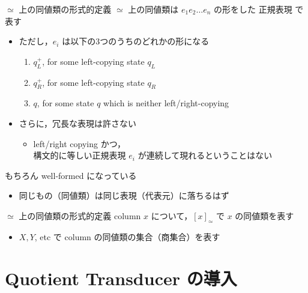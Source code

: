 \documentclass[presentation, xetex]{beamer}
\begin{document}
\begin{frame}[label={sec:org43cf7e5}]{\(\simeq\) 上の同値類の形式的定義}
\(\simeq\) 上の同値類は \(e_1 e_2 \dots e_n\) の形をした \alert{\alert{正規表現}} で表す
\begin{itemize}
\item ただし，\(e_i\) は以下の3つのうちのどれかの形になる

\begin{enumerate}
\item \(q_L^+\), for some left-copying state \(q_L\)

\item \(q_R^+\), for some left-copying state \(q_R\)

\item \(q\), for some state \(q\) which is neither left/right-copying
\end{enumerate}
\end{itemize}


\begin{itemize}
\item さらに，冗長な表現は許さない
\begin{itemize}
\item left/right copying かつ，\\
構文的に等しい正規表現 \(e_i\) が連続して現れるということはない
\end{itemize}
\end{itemize}


もちろん well-formed になっている
\begin{itemize}
\item 同じもの（同値類）は同じ表現（代表元）に落ちるはず
\end{itemize}
\end{frame}



\begin{frame}[label={sec:org5d0e790}]{\(\simeq\) 上の同値類の形式的定義}
column \(x\) について，\([x]_\simeq\) で \(x\) の同値類を表す
\begin{itemize}
\item \(X, Y\), etc で column の同値類の集合（商集合）を表す
\end{itemize}
\end{frame}



\section{Quotient Transducer の導入}
\label{sec:org3976501}
\end{document}
